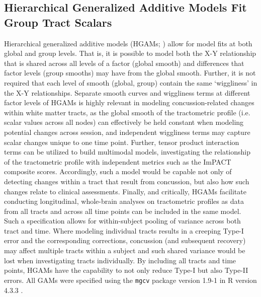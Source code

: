 \documentclass[12pt]{article}
\begin{document}
\subsection{Hierarchical Generalized Additive Models Fit Group Tract Scalars}
\label{ssec:meth-gam}
Hierarchical generalized additive models (HGAMs; \cite{pedersen2019HierarchicalGeneralizedAdditive}) allow for model fits at both global and group levels. That is, it is possible to model both the X-Y relationship that is shared across all levels of a factor (global smooth) and differences that factor levels (group smooths) may have from the global smooth. Further, it is not required that each level of smooth (global, group) contain the same `wiggliness' in the X-Y relationships. Separate smooth curves and wiggliness terms at different factor levels of HGAMs is highly relevant in modeling concussion-related changes within white matter tracts, as the global smooth of the tractometric profile (i.e. scalar values across all nodes) can effectively be held constant when modeling potential changes across session, and independent wiggliness terms may capture scalar changes unique to one time point. Further, tensor product interaction terms can be utilized to build multimodal models, investigating the relationship of the tractometric profile with independent metrics such as the ImPACT composite scores. Accordingly, such a model would be capable not only of detecting changes within a tract that result from concussion, but also how such changes relate to clinical assessments. Finally, and critically, HGAMs facilitate conducting longitudinal, whole-brain analyses on tractometric profiles as data from all tracts and across all time points can be included in the same model. Such a specification allows for within-subject pooling of variance across both tract and time. Where modeling individual tracts results in a creeping Type-I error and the corresponding corrections, concussion (and subsequent recovery) may affect multiple tracts within a subject and such shared variance would be lost when investigating tracts individually. By including all tracts and time points, HGAMs have the capability to not only reduce Type-I but also Type-II errors. All GAMs were specified using the \lstinline{mgcv} package version 1.9-1 \parencite{wood2017GeneralizedAdditiveModels} in R version 4.3.3 \parencite{rcoreteam2023LanguageEnvironmentStatistical}.
\end{document}
